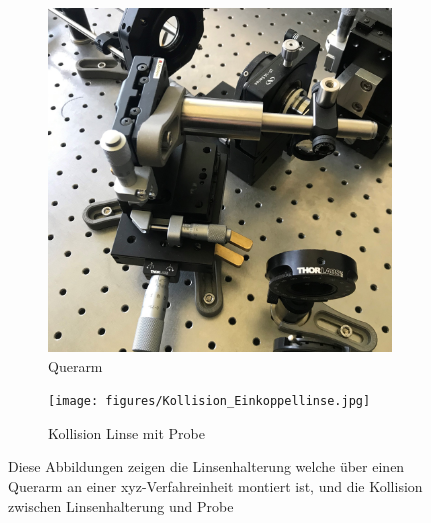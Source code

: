 \documentclass{article}
\begin{document}
		\begin{figure}
			\centering
			\begin{subfigure}[b]{0.4\textwidth}
				\centering
				\includegraphics[width=\textwidth]{figures/Einkoppellinse.jpg}
				\caption{Querarm}
				\label{fig:querarm}
			\end{subfigure}
			\hfill
			\begin{subfigure}[b]{0.4\textwidth}
				\centering
				\texttt{[image: figures/Kollision\_Einkoppellinse.jpg]}
				\caption{Kollision Linse mit Probe}
				\label{fig:kollision}
			\end{subfigure}
			\caption{Diese Abbildungen zeigen die Linsenhalterung welche über einen Querarm an einer xyz-Verfahreinheit montiert ist, und die Kollision zwischen Linsenhalterung und Probe}
			\label{fig:linsenhalterung}
		\end{figure}
\end{document}
